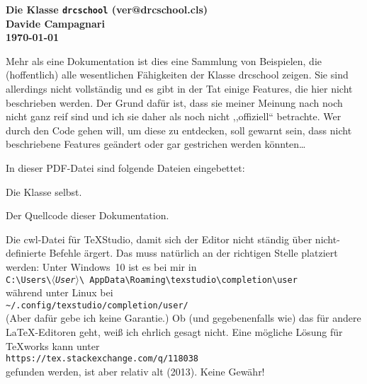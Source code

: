 \documentclass[hyperworksheet]{drcschool}
\date{30.\ Februar 1712}
\newcommand*{\pkg}[1]{\textup{\ttfamily#1}}                                     %
\newcommand*{\opt}[1]{\textup{\ttfamily#1}}                                     %
\newcommand*{\param}[1]{\mbox{\normalfont$\langle$\textit{#1}$\rangle$}}        %
\begin{document}
\begin{center}
\Large\bfseries Die Klasse \texttt{drcschool} (\csname ver@drcschool.cls\endcsname)\\
\normalfont\normalsize Davide Campagnari\\
\small\today
\end{center}
Mehr als eine Dokumentation ist dies eine Sammlung von Beispielen, die
(hoffentlich) alle wesentlichen Fähigkeiten der Klasse \pkg{drcschool} zeigen.
Sie sind allerdings nicht vollständig und es gibt in der Tat einige Features,
die hier nicht beschrieben werden. Der Grund dafür ist, dass sie meiner Meinung
nach noch nicht ganz reif sind und ich sie daher als noch nicht ,,offiziell``
betrachte. Wer durch den Code gehen will, um diese zu entdecken, soll gewarnt
sein, dass nicht beschriebene Features geändert oder gar gestrichen werden
könnten\ldots

In dieser PDF-Datei sind folgende Dateien eingebettet:
\begin{compactdesc}
\item[\ttfamily drcschool.cls] Die Klasse selbst.
\item[\ttfamily drcschool\textunderscore template.tex] Der Quellcode dieser Dokumentation.
\item[\ttfamily drcschool.cwl] Die \opt{cwl}-Datei für \TeX Studio, damit sich der Editor
nicht ständig über nicht-definierte Befehle ärgert. Das muss natürlich an der
richtigen Stelle platziert werden: Unter Windows~10 ist es bei mir in\\[.5ex]
\hspace*{2em}\texttt{C:\textbackslash Users\textbackslash\param{User}\textbackslash
    AppData\textbackslash Roaming\textbackslash texstudio\textbackslash completion\textbackslash user}\\[.5ex]
während unter Linux bei\\[.5ex]
\hspace*{2em}\texttt{\textasciitilde/.config/texstudio/completion/user/}\\[.5ex]
(Aber dafür gebe ich keine Garantie.)
Ob (und gegebenenfalls wie) das für andere
\LaTeX-Editoren geht, weiß ich ehrlich gesagt nicht. Eine mögliche Lösung für
\TeX works kann unter\\[.5ex]
\hspace*{2em}\texttt{https://tex.stackexchange.com/q/118038}\\[.5ex]
gefunden werden, ist aber relativ alt (2013). Keine Gewähr!
\end{compactdesc}
\end{document}
